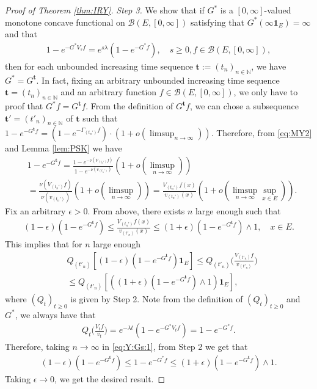 \documentclass[12pt,a4paper]{amsart}
\numberwithin{equation}{section}
\theoremstyle{plain}
\theoremstyle{definition}
\begin{document}
\begin{proof}[Proof of Theorem \ref{thm:IRY}]
\emph{Step 3.} 
  We show that if $G^*$ is a $[0,\infty]$-valued monotone concave functional on $\mathcal B(E,[0,\infty])$ satisfying that $G^*(\infty \mathbf 1_E) = \infty$ and that 
  \begin{align}
    1 - e^{- G^* V_sf} = e^{s\lambda} (1- e^{- G^* f}),
    \quad s \geq 0, f \in \mathcal B(E, [0,\infty]),
  \end{align}
  then for each unbounded increasing time sequence $\mathbf t:= (t_n)_{n\in \mathbb N}$, we have $G^* = G^{\mathbf t}$.
  In fact, fixing an arbitrary unbounded increasing time sequence $\mathbf t=(t_n)_{n\in \mathbb N}$ and an arbitrary function $f\in \mathcal B(E,[0,\infty])$, we only have to proof that $G^* f = G^{\mathbf t}f$.
From the definition of $G^{\mathbf t}f$, we can chose a subsequence $\mathbf t'=(t'_n)_{n \in \mathbb N}$ of $\mathbf t$ such that $ 1 - e^{- G^{\mathbf t}f} =  ( 1 - e^{-\Gamma_{( t_n')} f} ) \cdot (1+ o(\limsup_{n\to \infty})). $
Therefore, from \eqref{eq:MY2} and  Lemma \ref{lem:PSK} we have
\begin{align}
  & 1 - e^{- G^{\mathbf t}f}
  = \frac{1 - e^{- \nu( V_{(t_n')}f)}}{1- e^{- \nu(v_{(t_n')})}}  (1+o(\limsup_{n\to \infty})) \\
  & = \frac{\nu (V_{(t_n')} f)}{\nu(v_{(t_n')})}(1+o(\limsup_{n\to \infty})) 
  =  \frac{V_{(t_n')}f(x)}{v_{(t_n')}(x)} ( 1 + o(\limsup_{n \to \infty} \sup_{x\in E})).
\end{align}
Fix an arbitrary $\epsilon > 0$. 
From above, there exists $n$ large enough such that
\begin{align}
  (1-\epsilon) (1 - e^{- G^{\mathbf t}f} )
  \leq \frac{V_{(t_n')}f(x)}{v_{(t'_n)}(x)}
  \leq (1+\epsilon) ( 1 - e^{- G^{\mathbf t}f} ) \wedge 1,
  \quad x\in E.
\end{align}
This implies that for $n$ large enough 
\begin{align}
  \label{eq:Y:Gs:1}
  & Q_{(t'_n)}[ (1-\epsilon) (1-e^{-G^{\mathbf t}f})\mathbf 1_E ]
    \leq Q_{(t'_n)}\Big( \frac{V_{(t'_n)}f}{v_{(t'_n)}} \Big) 
  \\ &  \leq Q_{(t'_n)}[ ( (1+\epsilon) (1-e^{-G^{\mathbf t}f}) \wedge 1) \mathbf 1_E ],
\end{align}
where $(Q_t)_{t\geq 0}$ is given by Step 2.
Note from the definition of $(Q_t)_{t\geq 0}$ and $G^*$, we always have that
\begin{align}
	Q_t \Big( \frac{V_tf}{v_t}  \Big) 
  = e^{- \lambda t}( 1 - e^{- G^*V_tf}  )
  = 1- e^{- G^* f}.
\end{align}	
Therefore, taking $n \to \infty$ in \eqref{eq:Y:Gs:1}, from Step 2 we get that
\begin{align}
	(1 - \epsilon) (1 - e^{- G^{\mathbf t}f})
  \leq 1 - e^{- G^* f} 
  \leq (1 + \epsilon) (1 - e^{- G^{\mathbf t} f})\wedge 1.
\end{align}
Taking $\epsilon \to 0$, we get the desired result.


\end{proof}
\end{document}
